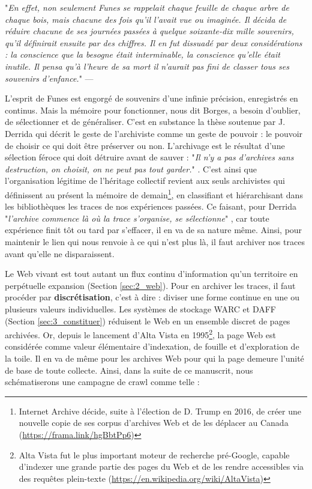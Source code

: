 \documentclass[symmetric,justified,marginals=raggedouter]{tufte-book}
\begin{document}
\begin{fullwidth}
"\textit{En effet, non seulement Funes se rappelait chaque feuille de chaque arbre de chaque bois, mais chacune des fois qu'il l'avait vue ou imaginée. Il décida de réduire chacune de ses journées passées à quelque soixante-dix mille souvenirs, qu'il définirait ensuite par des chiffres. Il en fut dissuadé par deux considérations : la conscience que la besogne était interminable, la conscience qu'elle était inutile. Il pensa qu'à l'heure de sa mort il n'aurait pas fini de classer tous ses souvenirs d'enfance.}" --- \citep[p.~116-117]{borges_fictions_1974}\\
\end{fullwidth}

\noindent L'esprit de Funes est engorgé de souvenirs d'une infinie précision, enregistrés en continus. Mais la mémoire pour fonctionner, nous dit Borges, a besoin d'oublier, de sélectionner et de généraliser. C'est en substance la thèse soutenue par J. Derrida qui décrit le geste de l'archiviste comme un geste de pouvoir : le pouvoir de choisir ce qui doit être préserver ou non. L'archivage est le résultat d'une sélection féroce qui doit détruire avant de sauver : "\textit{Il n'y a pas d'archives sans destruction, on choisit, on ne peut pas tout garder.}" \citep[p.~60]{derrida_trace_2014}. C'est ainsi que l'organisation légitime de l'héritage collectif revient aux seuls archivistes qui définissent au présent la mémoire de demain\footnote{Internet Archive décide, suite à l'élection de D. Trump en 2016, de créer une nouvelle copie de ses corpus d'archives Web et de les déplacer au Canada (\url{https://frama.link/hgBbtPp6})}, en classifiant et hiérarchisant dans les bibliothèques les traces de nos expériences passées. Ce faisant, pour Derrida "\textit{l'archive commence là où la trace s'organise, se sélectionne}" \citep[p.~61]{derrida_trace_2014}, car toute expérience finit tôt ou tard par s'effacer, il en va de sa nature même. Ainsi, pour maintenir le lien qui nous renvoie à ce qui n'est plus là, il faut archiver nos traces avant qu'elle ne disparaissent. 

Le Web vivant est tout autant un flux continu d'information qu'un territoire en perpétuelle expansion (Section \ref{sec:2_web}). Pour en archiver les traces, il faut procéder par \textbf{discrétisation}, c'est à dire : diviser une forme continue en une ou plusieurs valeurs individuelles. Les systèmes de stockage WARC et DAFF (Section \ref{sec:3_constituer}) réduisent le Web en un ensemble discret de pages archivées. Or, depuis le lancement d'Alta Vista en 1995\footnote{Alta Vista fut le plus important moteur de recherche pré-Google, capable d'indexer une grande partie des pages du Web et de les rendre accessibles via des requêtes plein-texte (\url{https://en.wikipedia.org/wiki/AltaVista})}, la page Web est considérée comme valeur élémentaire d'indexation, de fouille et d'exploration de la toile. Il en va de même pour les archives Web pour qui la page demeure l'unité de base de toute collecte. Ainsi, dans la suite de ce manuscrit, nous schématiserons une campagne de crawl comme telle : 
\end{document}

